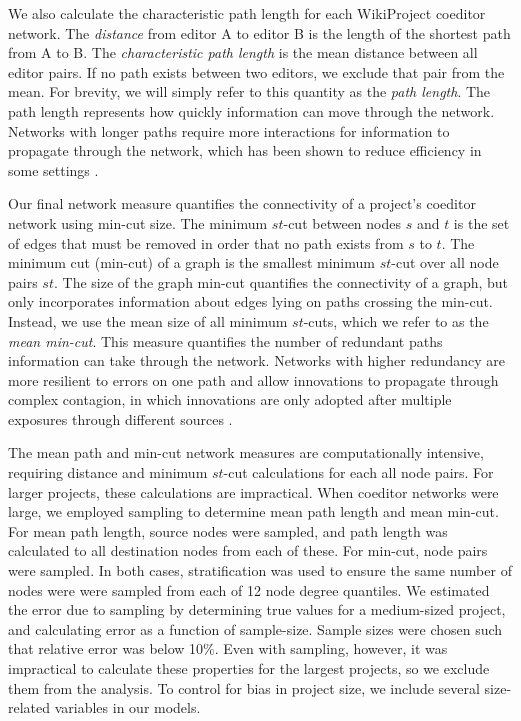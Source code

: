 We also calculate the characteristic path length for each WikiProject coeditor network.
The {\em distance} from editor A to editor B is the length of the shortest path from A to B.
The {\em characteristic path length} is the mean distance between all editor pairs.
If no path exists between two editors, we exclude that pair from the mean.
For brevity, we will simply refer to this quantity as the {\em path length}.
The path length represents how quickly information can move through the network.
Networks with longer paths require more interactions for information to propagate through
the network,
which has been shown to reduce efficiency in some settings
\cite{mason_propagation_2008,barkoczi_social_2016}.

Our final network measure quantifies the connectivity of a project's coeditor network using
min-cut size.
The minimum $st$-cut between nodes $s$ and $t$ is the set of edges that must be removed in order that
no path exists from $s$ to $t$.
The minimum cut (min-cut) of a graph is the smallest minimum $st$-cut over all node pairs $st$. 
The size of the graph min-cut quantifies the connectivity of a graph,
but only incorporates information about edges lying on paths crossing the min-cut.
Instead, we use the mean size of all minimum $st$-cuts, which we refer to as the
{\em mean min-cut}.
This measure quantifies the number of redundant paths information can take through the network.
Networks with higher redundancy are more resilient to errors on one path \cite{albert_error_2000}
and allow innovations to propagate through complex contagion,
in which innovations are only adopted after multiple exposures through different sources
\cite{centola_complex_2007}.

The mean path and min-cut network measures are computationally intensive,
requiring distance and minimum $st$-cut calculations for each all node pairs.
For larger projects, these calculations are impractical.
When coeditor networks were large, we employed sampling to determine mean path length and mean
min-cut.
For mean path length, source nodes were sampled, and path length was calculated to all destination nodes
from each of these.
For min-cut, node pairs were sampled.
In both cases, stratification was used to ensure the same number of nodes were were sampled from each of
12 node degree quantiles.
We estimated the error due to sampling by determining true values for a medium-sized project,
and calculating error as a function of sample-size.
Sample sizes were chosen such that relative error was below 10\%.
Even with sampling, however, it was impractical to calculate these properties for the largest projects,
so we exclude them from the analysis.
To control for bias in project size, we include several size-related variables in our models.

